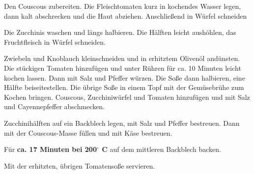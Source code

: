 \vspace*{\fill}
\begin{multicols}{2}

Den Couscous zubereiten.\newline
Die Fleischtomaten kurz in kochendes Wasser legen, dann kalt abschrecken und die
Haut abziehen. Anschließend in Würfel schneiden\newline

Die Zucchinis waschen und längs halbieren. Die Hälften leicht aushöhlen, das Fruchtfleisch in Würfel schneiden.

Zwiebeln und Knoblauch kleinschneiden und in erhitztem Olivenöl andünsten.
Die stückigen Tomaten hinzufügen und unter Rühren für ca. 10 Minuten leicht kochen lassen.
Dann mit Salz und Pfeffer würzen.\newline
Die Soße dann halbieren, eine Hälfte beiseitestellen. Die übrige Soße in einem Topf mit der 
Gemüsebrühe zum Kochen bringen.\newline
Couscous, Zucchiniwürfel und Tomaten hinzufügen und mit Salz und Cayennepfeffer abschmecken.

Zucchinihälften auf ein Backblech legen, mit Salz und Pfeffer bestreuen. Dann mit der Couscous-Masse
füllen und mit Käse bestreuen.

Für \textbf{ca. 17 Minuten bei 200$^\circ$ C} auf dem mittleren Backblech backen.\newline

Mit der erhitzten, übrigen Tomatensoße servieren.


\end{multicols}
\vfill
